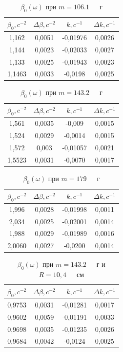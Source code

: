 \documentclass[a4paper,12pt]{article} %
\begin{document}
\begin{table}[!ht]
    \centering
    \begin{tabular}{|c|c|c|c|}
    \hline
        $\beta_0, c^{-2}$ & $\Delta \beta, c^{-2}$ & $k, c^{-1}$ & $\Delta k, c^{-1}$ \\ \hline
        1,162 & 0,0051 & -0,01976 & 0,0026  \\ \hline
        1,144 & 0,0023 & -0,02033 & 0,0027  \\ \hline
        1,133 & 0,0025 & -0,01943 & 0,0023  \\ \hline
        1,1463 & 0,0033 & -0,0198 & 0,0025  \\ \hline
    \end{tabular}
    \caption{$\beta_0(\omega)$ при $m=106.1$~~~г}
\end{table}
\begin{table}[!ht]
    \centering
    \begin{tabular}{|c|c|c|c|}
    \hline
        $\beta_0, c^{-2}$ & $\Delta \beta, c^{-2}$ &$ k, c^{-1}$ & $\Delta k, c^{-1}$ \\ \hline
        1,561 & 0,0035 & -0,009 & 0,0015  \\ \hline
        1,524 & 0,0029 & -0,0014 & 0,0015  \\ \hline
        1,572 & 0,003 & -0,01057 & 0,0021  \\ \hline
        1,5523 & 0,0031 & -0,0070 & 0,0017  \\ \hline
    \end{tabular}
    \caption{$\beta_0(\omega)$ при $m=143.2$~~~г}
\end{table}
\begin{table}[!ht]
    \centering
    \begin{tabular}{|c|c|c|c|}
    \hline
        $\beta_0, c^{-2}$ & $\Delta \beta, c^{-2}$ & $k, c^{-1}$ & $\Delta k, c^{-1}$ \\ \hline
        1,996 & 0,0028 & -0,01998 & 0,0011  \\ \hline
        2,034 & 0,0025 & -0,02001 & 0,0014  \\ \hline
        1,988 & 0,0029 & -0,01989 & 0,0016  \\ \hline
        2,0060 & 0,0027 & -0,0200 & 0,0014  \\ \hline
    \end{tabular}
    \caption{$\beta_0(\omega)$ при $m=179$~~~г}
\end{table}
\begin{table}[!ht]
    \centering
    \begin{tabular}{|c|c|c|c|}
    \hline
        $\beta_0, c^{-2}$ & $\Delta \beta, c^{-2}$ & $k, c^{-1}$ & $\Delta k, c^{-1}$ \\ \hline
        0,9753 & 0,0031 & -0,01281 & 0,0017  \\ \hline
        0,9602 & 0,0059 & -0,01191 & 0,0033  \\ \hline
        0,9698 & 0,0035 & -0,01235 & 0,0026  \\ \hline
        0,9684 & 0,0042 & -0,0124 & 0,0025  \\ \hline
    \end{tabular}
    \caption{$\beta_0(\omega)$ при $m=143.2$~~~г и $R= 10,4$~~~см}
\end{table}
\end{document}
